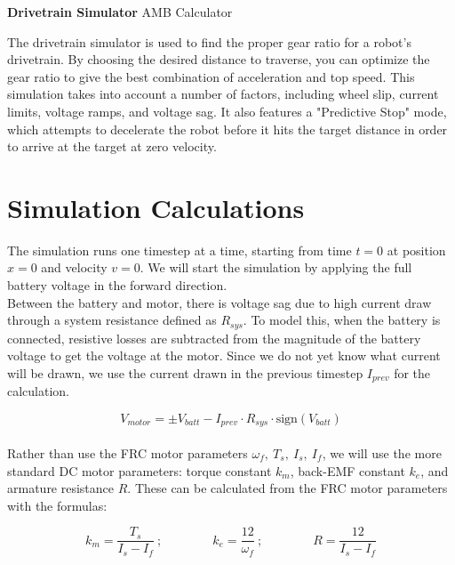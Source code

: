 \documentclass[a4paper]{article}
\begin{document}
	
	\Huge\textbf{Drivetrain Simulator}
	\newline
	\LARGE AMB Calculator
	
	\vspace{0.5cm}
	\normalsize
	
	The drivetrain simulator is used to find the proper gear ratio for a robot's drivetrain. By choosing the desired distance to traverse, you can optimize the gear ratio to give the best combination of acceleration and top speed. This simulation takes into account a number of factors, including wheel slip, current limits, voltage ramps, and voltage sag. It also features a "Predictive Stop" mode, which attempts to decelerate the robot before it hits the target distance in order to arrive at the target at zero velocity.
	
	\section*{Simulation Calculations}
	
	The simulation runs one timestep at a time, starting from time $ t=0 $ at position $ x=0 $ and velocity $ v=0 $. We will start the simulation by applying the full battery voltage in the forward direction. \\
	
	Between the battery and motor, there is voltage sag due to high current draw through a system resistance defined as $ R_{sys} $. To model this, when the battery is connected, resistive losses are subtracted from the magnitude of the battery voltage to get the voltage at the motor. Since we do not yet know what current will be drawn, we use the current drawn in the previous timestep $ I_{prev} $ for the calculation.
	
	\begin{equation}
		V_{motor} = \pm V_{batt} - I_{prev} \cdot R_{sys} \cdot \text{sign} \left( V_{batt} \right)
	\end{equation}\\
	
	Rather than use the FRC motor parameters $ \omega_f,\ T_s,\ I_s,\ I_f $, we will use the more standard DC motor parameters: torque constant $ k_m $, back-EMF constant $ k_e $, and armature resistance $ R $. These can be calculated from the FRC motor parameters with the formulas:
	
	\begin{equation}
		k_m = \frac{T_s}{I_s - I_f}\ ; \qquad\qquad
		k_e = \frac{12}{\omega_f}\ ; \qquad\qquad
		R = \frac{12}{I_s - I_f}
	\end{equation}\\
	
\end{document}
